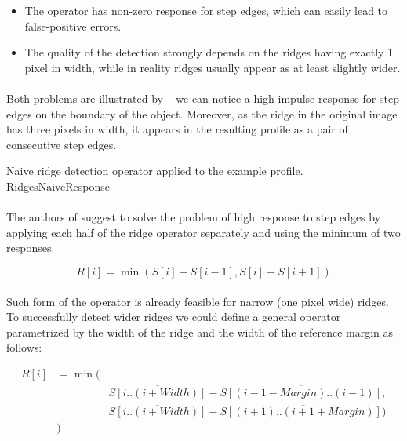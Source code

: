 \begin{itemize}
	\item The operator has non-zero response for step edges, which can easily lead to false-positive errors.
	\item The quality of the detection strongly depends on the ridges having exactly 1 pixel in width, while in reality ridges usually appear as at least slightly wider.
\end{itemize}

\paragraph*{}
Both problems are illustrated by  -- we can notice a high impulse response for step edges on the boundary of the object. Moreover, as the ridge in the original image has three pixels in width, it appears in the resulting profile as a pair of consecutive step edges.

\profileFigure
{
}
{Naive ridge detection operator applied to the example profile.}
{RidgesNaiveResponse}

\paragraph*{}
The authors of \cite{Subirana-VilanovaSung93} suggest to solve the problem of high response to step edges by applying each half of the ridge operator separately and using the minimum of two responses.

\[
	R[i] = \min(S[i]-S[i-1],S[i]-S[i+1])
\]

\paragraph*{}
Such form of the operator is already feasible for narrow (one pixel wide) ridges. To successfully detect wider ridges we could define a general operator parametrized by the width of the ridge and the width of the reference margin as follows:

\begin{eqnarray*}
R[i] & = \min( & \\
	& & \overline{S[i..(i+Width)]}-\overline{S[(i-1-Margin)..(i-1)]}, \\
	& & \overline{S[i..(i+Width)]}-\overline{S[(i+1)..(i+1+Margin)])} \\
	& ) &
\end{eqnarray*}

